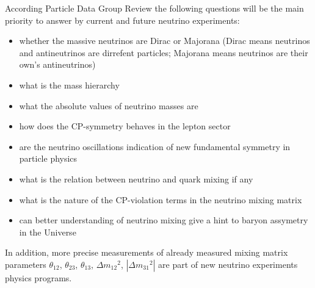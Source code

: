 According Particle Data Group Review \cite{ref_PDG} the following questions will be the main priority to answer by current and future neutrino experiments:
\begin{itemize}
  \item whether the massive neutrinos are Dirac or Majorana (Dirac means neutrinos and antineutrinos are dirrefent particles; Majorana means neutrinos are their own's antineutrinos)
  \item what is the mass hierarchy
  \item what the absolute values of neutrino masses are
  \item how does the CP-symmetry behaves in the lepton sector
  \item are the neutrino oscillations indication of new fundamental symmetry in particle physics
  \item what is the relation between neutrino and quark mixing if any
  \item what is the nature of the CP-violation terms in the neutrino mixing matrix
  \item can better understanding of neutrino mixing give a hint to baryon assymetry in the Universe 
\end{itemize} 
In addition, more precise measurements of already measured mixing matrix parameters $\theta_{12}$, $\theta_{23}$, $\theta_{13}$, $\Delta{m_{12}}^2$, $|\Delta{m_{31}}^2|$ are part of new neutrino experiments physics programs.

